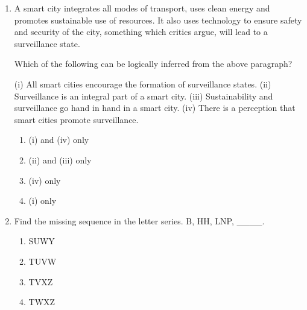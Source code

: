 \documentclass[journal,12pt,onecolumn]{IEEEtran}
\theoremstyle{remark}
\begin{document}
\begin{enumerate}
\item A smart city integrates all modes of transport, uses clean energy and promotes sustainable use of resources. It also uses technology to ensure safety and security of the city, something which critics argue, will lead to a surveillance state.

Which of the following can be logically inferred from the above paragraph?

(i) All smart cities encourage the formation of surveillance states.
(ii) Surveillance is an integral part of a smart city.
(iii) Sustainability and surveillance go hand in hand in a smart city.
(iv) There is a perception that smart cities promote surveillance.

\begin{multicols}{2}
\begin{enumerate}
    \item (i) and (iv) only
    \item (ii) and (iii) only
    \item (iv) only
    \item (i) only
\end{enumerate}
\end{multicols}


\item Find the missing sequence in the letter series.
B, HH, LNP, \_\_\_\_. 

\begin{multicols}{4}
\begin{enumerate}
    \item SUWY
    \item TUVW
    \item TVXZ
    \item TWXZ
\end{enumerate}
\end{multicols}



\end{enumerate}
\end{document}

